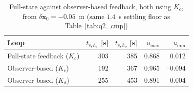 \documentclass[10pt,a4paper]{scrartcl}
\begin{document}
\begin{table}[htbp]
    \centering
    \small
    \renewcommand{\arraystretch}{1.1}
    \begin{tabular}{l r r r r}
        \toprule
        Loop & \large $t_{s,h_1}$ \normalsize[s] & \large $t_{s,h_2}$ \normalsize [s] & $u_{\text{max}}$ & $u_{\text{min}}$ \\
        \midrule
        Full-state feedback ($K_c$)   & 303 & 385 & 0.868 & \phantom{$-$}0.012 \\
        Observer-based ($K_c$)        & 192 & 367 & 0.965 & --0.094         \\
        Observer-based ($K_d$)        & 255 & 453 & 0.891 & \phantom{$-$}0.004 \\
        \bottomrule
    \end{tabular}
    \caption{Full-state against observer-based feedback, both using $K_c$,
    from $\delta\bm{x}_0=-0.05$~m (same $1.4$~s settling floor as
    Table~\ref{tab:q2_cmp})}
    \label{tab:q3_cmp}
\end{table}


\end{document}
